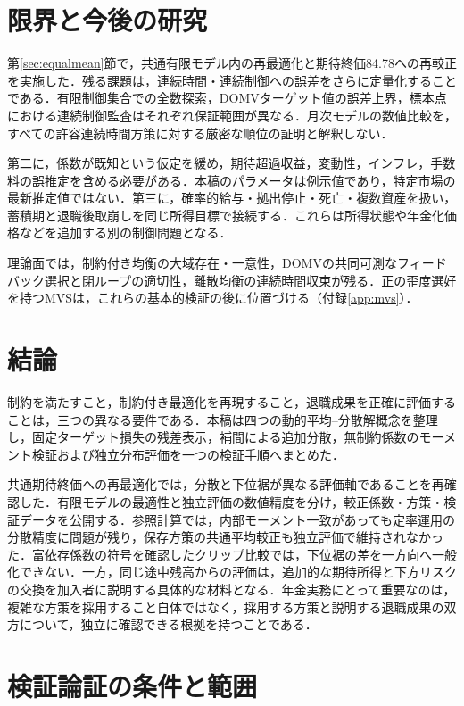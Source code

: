 \documentclass[10pt,a4paper]{article}
\numberwithin{equation}{section}
\numberwithin{table}{section}
\numberwithin{figure}{section}
\theoremstyle{plain}
\theoremstyle{definition}
\begin{document}
\section{限界と今後の研究}
\label{sec:limits}
第\ref{sec:equalmean}節で，共通有限モデル内の再最適化と期待終価84.78への再較正を実施した．残る課題は，連続時間・連続制御への誤差をさらに定量化することである．有限制御集合での全数探索，DOMVターゲット値の誤差上界，標本点における連続制御監査はそれぞれ保証範囲が異なる．月次モデルの数値比較を，すべての許容連続時間方策に対する厳密な順位の証明と解釈しない．

第二に，係数が既知という仮定を緩め，期待超過収益，変動性，インフレ，手数料の誤推定を含める必要がある．本稿のパラメータは例示値であり，特定市場の最新推定値ではない．第三に，確率的給与・拠出停止・死亡・複数資産を扱い，蓄積期と退職後取崩しを同じ所得目標で接続する．これらは所得状態や年金化価格などを追加する別の制御問題となる．

理論面では，制約付き均衡の大域存在・一意性，DOMVの共同可測なフィードバック選択と閉ループの適切性，離散均衡の連続時間収束が残る．正の歪度選好を持つMVSは，これらの基本的検証の後に位置づける（付録\ref{app:mvs}）．

\section{結論}
制約を満たすこと，制約付き最適化を再現すること，退職成果を正確に評価することは，三つの異なる要件である．本稿は四つの動的平均--分散解概念を整理し，固定ターゲット損失の残差表示，補間による追加分散，無制約係数のモーメント検証および独立分布評価を一つの検証手順へまとめた．

共通期待終価への再最適化では，分散と下位裾が異なる評価軸であることを再確認した．有限モデルの最適性と独立評価の数値精度を分け，較正係数・方策・検証データを公開する．参照計算では，内部モーメント一致があっても定率運用の分散精度に問題が残り，保存方策の共通平均較正も独立評価で維持されなかった．富依存係数の符号を確認したクリップ比較では，下位裾の差を一方向へ一般化できない．一方，同じ途中残高からの評価は，追加的な期待所得と下方リスクの交換を加入者に説明する具体的な材料となる．年金実務にとって重要なのは，複雑な方策を採用すること自体ではなく，採用する方策と説明する退職成果の双方について，独立に確認できる根拠を持つことである．

\appendix
\section{検証論証の条件と範囲}
\label{app:verify}
\end{document}
